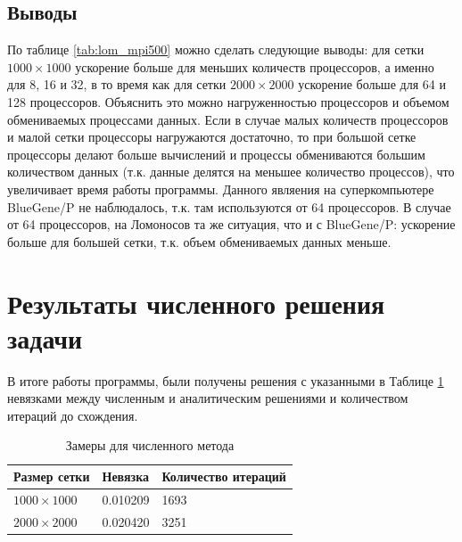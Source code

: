 \documentclass[12pt, a4paper]{article}
\begin{document}
        \subsection{Выводы}
            По таблице \ref{tab:lom_mpi500} можно сделать следующие выводы: для сетки $1000 \times 1000$ ускорение больше для меньших количеств процессоров, а именно для 8, 16 и 32, в то время как для сетки $2000 \times 2000$ ускорение больше для 64 и 128 процессоров. Объяснить это можно нагруженностью процессоров и объемом обмениваемых процессами данных. Если в случае малых количеств процессоров и малой сетки процессоры нагружаются достаточно, то при большой сетке процессоры делают больше вычислений и процессы обмениваются большим количеством данных (т.к. данные делятся на меньшее количество процессов), что увеличивает время работы программы. Данного являения на суперкомпьютере BlueGene/P не наблюдалось, т.к. там используются от 64 процессоров. В случае от 64 процессоров, на Ломоносов та же ситуация, что и с BlueGene/P: ускорение больше для большей сетки, т.к. объем обмениваемых данных меньше.

    \section{Результаты численного решения задачи}
        В итоге работы программы, были получены решения с указанными в Таблице \ref{tab:res} невязками между численным и аналитическим решениями и количеством итераций до схождения.
        \begin{table}[H]
            \centering
            \caption{Замеры для численного метода}
            \label{tab:res}
            \begin{tabular}{|l|l|l|}
            \hline
            \textbf{Размер сетки} & \textbf{Невязка} & \textbf{Количество итераций} \\ \hline
            $1000 \times 1000$    & 0.010209         & 1693                         \\ \hline
            $2000 \times 2000$    & 0.020420         & 3251                         \\ \hline
            \end{tabular}
        \end{table}
\end{document}
